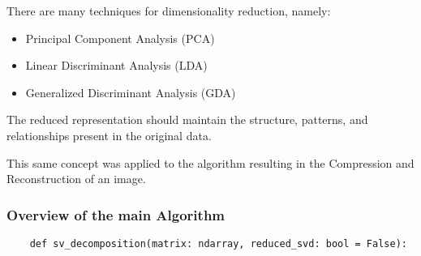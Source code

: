 \documentclass{article} %
\theoremstyle{definition}
\theoremstyle{remark}
\theoremstyle{plain}
\begin{document}
        There are many techniques for dimensionality reduction, namely:
        \begin{itemize}[label={--}]
            \item Principal Component Analysis (PCA)
            \item Linear Discriminant Analysis (LDA)
            \item Generalized Discriminant Analysis (GDA)
        \end{itemize}

        The reduced representation should maintain the structure, patterns, and relationships present in the original data. 
        
        This same concept was applied to the algorithm resulting in the Compression and Reconstruction of an image. 

    \subsubsection{Overview of the main Algorithm}
    \begin{verbatim}
    def sv_decomposition(matrix: ndarray, reduced_svd: bool = False):
    \end{verbatim}
    
\end{document}
